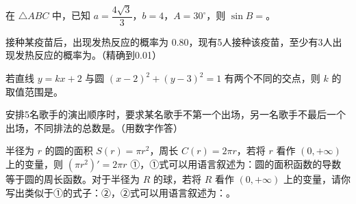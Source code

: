 \begin{question}
在 $\triangle ABC$ 中，已知 $a=\dfrac{4\sqrt3}{3}$，$b=4$，$A=30^\circ$，则 $\sin B=$\gkblank{}。

\end{question}
\begin{question}
接种某疫苗后，出现发热反应的概率为 $0.80$，现有5人接种该疫苗，至少有3人出现发热反应的概率为\gkblank{}。（精确到0.01）

\end{question}
\begin{question}
若直线 $y=kx+2$ 与圆 $(x-2)^2+(y-3)^2=1$ 有两个不同的交点，则 $k$ 的取值范围是\gkblank{}。

\end{question}
\begin{question}
安排5名歌手的演出顺序时，要求某名歌手不第一个出场，另一名歌手不最后一个出场，不同排法的总数是\gkblank{}。（用数字作答）

\end{question}
\begin{question}
半径为 $r$ 的圆的面积 $S(r)=\pi r^2$，周长 $C(r)=2\pi r$，若将 $r$ 看作 $(0,+\infty)$ 上的变量，则 $(\pi r^2)'=2\pi r$ ①，①式可以用语言叙述为：圆的面积函数的导数等于圆的周长函数。对于半径为 $R$ 的球，若将 $R$ 看作 $(0,+\infty)$ 上的变量，请你写出类似于①的式子：\gkblank{}②，②式可以用语言叙述为：\gkblank{}。

\end{question}

